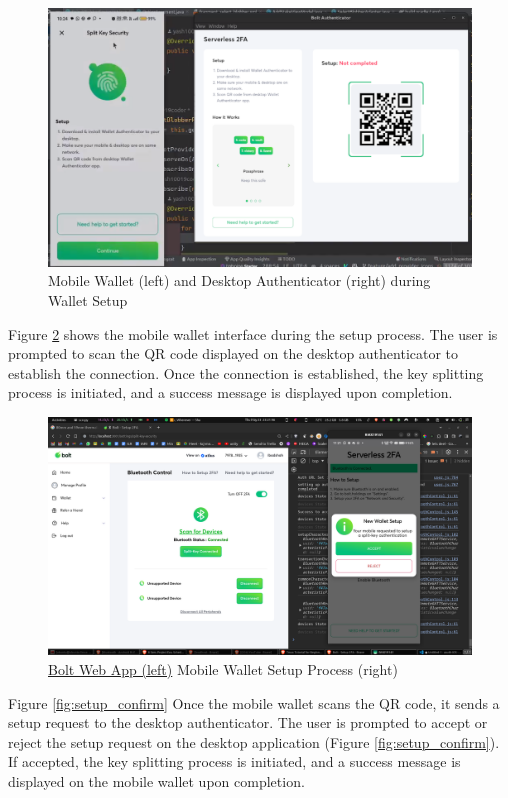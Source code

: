 \begin{figure}[h]
    \centering
    \includegraphics[width=\textwidth]{Images/setup_desktop.png}
    \caption{Mobile Wallet (left) and Desktop Authenticator (right) during Wallet Setup}
    \label{fig:setup_desktop}
\end{figure}

Figure \ref{fig:setup_mobile} shows the mobile wallet interface during the setup process. The user is prompted to scan the QR code displayed on the desktop authenticator to establish the connection. Once the connection is established, the key splitting process is initiated, and a success message is displayed upon completion.

\begin{figure}[h]
    \centering
    \includegraphics[width=\textwidth]{Images/setup_mobile.png}
    \caption{\href{https://bolt.holdings}{Bolt Web App (left)} Mobile Wallet Setup Process (right)}
    \label{fig:setup_mobile}
\end{figure}

Figure \ref{fig:setup_confirm} Once the mobile wallet scans the QR code, it sends a setup request to the desktop authenticator. The user is prompted to accept or reject the setup request on the desktop application (Figure \ref{fig:setup_confirm}). If accepted, the key splitting process is initiated, and a success message is displayed on the mobile wallet upon completion.

